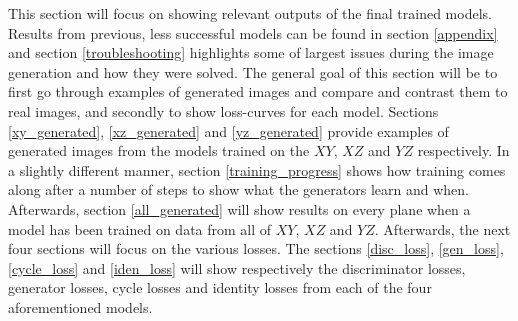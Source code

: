 \documentclass[12pt, fleqn, titlepage]{article}
\begin{document}

This section will focus on showing relevant outputs of the final trained models. Results from previous, less successful models can be found in section \ref{appendix} and section \ref{troubleshooting} highlights some of largest issues during the image generation and how they were solved. The general goal of this section will be to first go through examples of generated images and compare and contrast them to real images, and secondly to show loss-curves for each model. Sections \ref{xy_generated}, \ref{xz_generated} and \ref{yz_generated} provide examples of generated images from the models trained on the $XY$, $XZ$ and $YZ$ respectively. In a slightly different manner, section \ref{training_progress} shows how training comes along after a number of steps to show what the generators learn and when. Afterwards, section \ref{all_generated} will show results on every plane when a model has been trained on data from all of $XY$, $XZ$ and $YZ$. Afterwards, the next four sections will focus on the various losses. The sections \ref{disc_loss}, \ref{gen_loss}, \ref{cycle_loss} and \ref{iden_loss} will show respectively the discriminator losses, generator losses, cycle losses and identity losses from each of the four aforementioned models.
\end{document}
